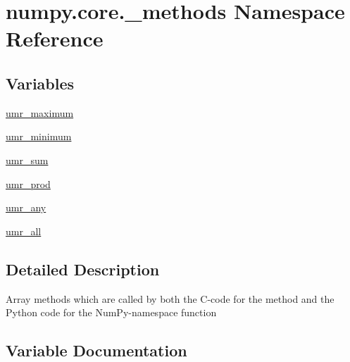 \hypertarget{namespacenumpy_1_1core_1_1__methods}{}\section{numpy.\+core.\+\_\+methods Namespace Reference}
\label{namespacenumpy_1_1core_1_1__methods}
\subsection*{Variables}
\begin{DoxyCompactItemize}
\item 
\hyperlink{namespacenumpy_1_1core_1_1__methods_a503690e555e76e7d68b834c494843051}{umr\+\_\+maximum}
\item 
\hyperlink{namespacenumpy_1_1core_1_1__methods_a0818df262df2785335180a62547a429e}{umr\+\_\+minimum}
\item 
\hyperlink{namespacenumpy_1_1core_1_1__methods_ae8ae7221154d6ef520a85c94d17a6517}{umr\+\_\+sum}
\item 
\hyperlink{namespacenumpy_1_1core_1_1__methods_a8be08b547d34873459a5514f8d406cc8}{umr\+\_\+prod}
\item 
\hyperlink{namespacenumpy_1_1core_1_1__methods_a3b28467368200c4d9e7f3747e2f3dadb}{umr\+\_\+any}
\item 
\hyperlink{namespacenumpy_1_1core_1_1__methods_a04790b801c94ee13a9ed6983ea3cc7e8}{umr\+\_\+all}
\end{DoxyCompactItemize}


\subsection{Detailed Description}
\begin{DoxyVerb}Array methods which are called by both the C-code for the method
and the Python code for the NumPy-namespace function\end{DoxyVerb}
 

\subsection{Variable Documentation}
\mbox{\label{namespacenumpy_1_1core_1_1__methods_a04790b801c94ee13a9ed6983ea3cc7e8}} 

